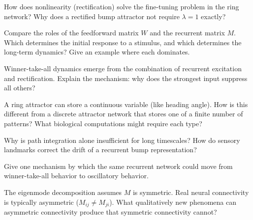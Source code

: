 \begin{conceptquestions}
  \item How does nonlinearity (rectification) solve the fine-tuning problem in the ring network? Why does a rectified bump attractor not require $\lambda = 1$ exactly?

  \item Compare the roles of the feedforward matrix $W$ and the recurrent matrix $M$. Which determines the initial response to a stimulus, and which determines the long-term dynamics? Give an example where each dominates.

  \item Winner-take-all dynamics emerge from the combination of recurrent excitation and rectification. Explain the mechanism: why does the strongest input suppress all others?

  \item A ring attractor can store a continuous variable (like heading angle). How is this different from a discrete attractor network that stores one of a finite number of patterns? What biological computations might require each type?

  \item Why is path integration alone insufficient for long timescales? How do sensory landmarks correct the drift of a recurrent bump representation?

  \item Give one mechanism by which the same recurrent network could move from winner-take-all behavior to oscillatory behavior.

  \item The eigenmode decomposition assumes $M$ is symmetric. Real neural connectivity is typically asymmetric ($M_{ij} \neq M_{ji}$). What qualitatively new phenomena can asymmetric connectivity produce that symmetric connectivity cannot?
\end{conceptquestions}
